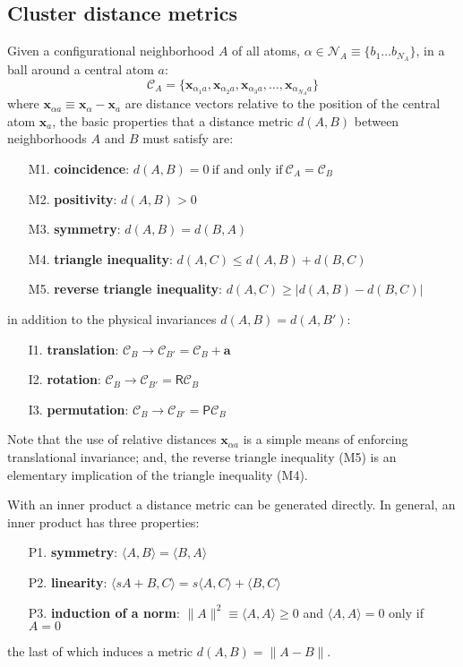 \documentclass[journal=jctcce,manuscript=article]{achemso}
\newcommand{\neighborhood}{\mathcal{C}}
\newcommand{\ab}{\mathbf{a}}
\newcommand{\xb}{\mathbf{x}}
\newcommand{\Rs}{\mathsf{R}}
\newcommand{\Ps}{\mathsf{P}}
\newcommand{\Nc}{\mathcal{N}}
\begin{document}
\subsection{Cluster distance metrics}
Given a configurational neighborhood $A$ of all atoms, $\alpha \in \Nc_A \equiv \{b_1\ldots b_{N_A}\}$, in a ball around a central atom $a$:
\begin{equation}
\neighborhood_A = \{ \xb_{\alpha_1 a}, \xb_{\alpha_2 a}, \xb_{\alpha_3 a}, \ldots, \xb_{\alpha_{N_A} a} \}
\end{equation}
where $\xb_{\alpha a} \equiv \xb_\alpha - \xb_a$ are distance vectors relative to the position of the central atom $\xb_a$,
the basic properties that a distance metric $d(A,B)$ between neighborhoods $A$ and $B$ must satisfy are:
\begin{enumerate} \setlength{\itemsep}{-10pt}
\item[M1.] {\bf coincidence}: $d(A,B) = 0 \ \text{if and only if} \ \neighborhood_A=\neighborhood_B $ 
\item[M2.] {\bf positivity}:  $d(A,B) > 0 $ 
\item[M3.] {\bf symmetry}:    $d(A,B) = d(B,A)$
\item[M4.] {\bf triangle inequality}: $d(A,C) \le d(A,B) + d(B,C)$ 
\item[M5.] {\bf reverse triangle inequality}: $d(A,C) \ge | d(A,B) - d(B,C) |$ 
\end{enumerate}
in addition to the physical invariances $d(A,B) = d(A,B')$:
\begin{enumerate} \setlength{\itemsep}{-10pt}
\item[I1.] {\bf translation}: $\neighborhood_B \to \neighborhood_{B'} = \neighborhood_B + \ab$
\item[I2.] {\bf rotation}:    $\neighborhood_B \to \neighborhood_{B'} = \Rs \neighborhood_B $
\item[I3.] {\bf permutation}: $\neighborhood_B \to \neighborhood_{B'} = \Ps \neighborhood_B $
\end{enumerate}
Note that the use of relative distances $\xb_{\alpha a}$ is a simple means of enforcing translational invariance; and, the reverse triangle inequality (M5) is an elementary  implication of the triangle inequality (M4).

With an inner product a distance metric can be generated directly.
In general, an inner product has three properties:
\begin{enumerate} \setlength{\itemsep}{-10pt}
\item[P1.] {\bf symmetry}: $\langle A, B \rangle = \langle B, A \rangle$
\item[P2.] {\bf linearity}: $\langle s A + B, C \rangle = s \langle A, C \rangle + \langle B, C \rangle$ 
\item[P3.] {\bf induction of a norm}: $\| A \|^2 \equiv \langle A, A \rangle \ge 0$ and $\langle A, A \rangle = 0$ only if $A = 0$
\end{enumerate}
the last of which induces a metric $d(A,B) = \| A - B \|$.
\end{document}
